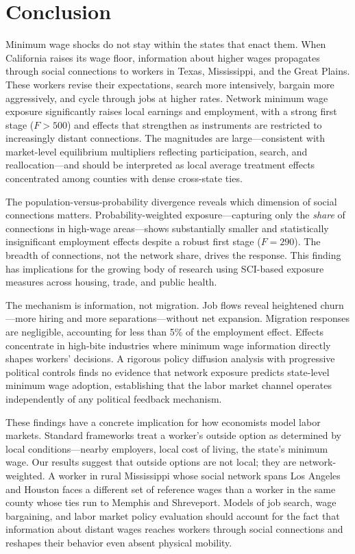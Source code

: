 \documentclass[12pt]{article}
\begin{document}
\section{Conclusion}
\label{sec:conclusion}

Minimum wage shocks do not stay within the states that enact them. When California raises its wage floor, information about higher wages propagates through social connections to workers in Texas, Mississippi, and the Great Plains. These workers revise their expectations, search more intensively, bargain more aggressively, and cycle through jobs at higher rates. Network minimum wage exposure significantly raises local earnings and employment, with a strong first stage ($F > 500$) and effects that strengthen as instruments are restricted to increasingly distant connections. The magnitudes are large---consistent with market-level equilibrium multipliers reflecting participation, search, and reallocation---and should be interpreted as local average treatment effects concentrated among counties with dense cross-state ties.

The population-versus-probability divergence reveals which dimension of social connections matters. Probability-weighted exposure---capturing only the \textit{share} of connections in high-wage areas---shows substantially smaller and statistically insignificant employment effects despite a robust first stage ($F = 290$). The breadth of connections, not the network share, drives the response. This finding has implications for the growing body of research using SCI-based exposure measures across housing, trade, and public health.

The mechanism is information, not migration. Job flows reveal heightened churn---more hiring and more separations---without net expansion. Migration responses are negligible, accounting for less than 5\% of the employment effect. Effects concentrate in high-bite industries where minimum wage information directly shapes workers' decisions. A rigorous policy diffusion analysis with progressive political controls finds no evidence that network exposure predicts state-level minimum wage adoption, establishing that the labor market channel operates independently of any political feedback mechanism.

These findings have a concrete implication for how economists model labor markets. Standard frameworks treat a worker's outside option as determined by local conditions---nearby employers, local cost of living, the state's minimum wage. Our results suggest that outside options are not local; they are network-weighted. A worker in rural Mississippi whose social network spans Los Angeles and Houston faces a different set of reference wages than a worker in the same county whose ties run to Memphis and Shreveport. Models of job search, wage bargaining, and labor market policy evaluation should account for the fact that information about distant wages reaches workers through social connections and reshapes their behavior even absent physical mobility.
\end{document}
